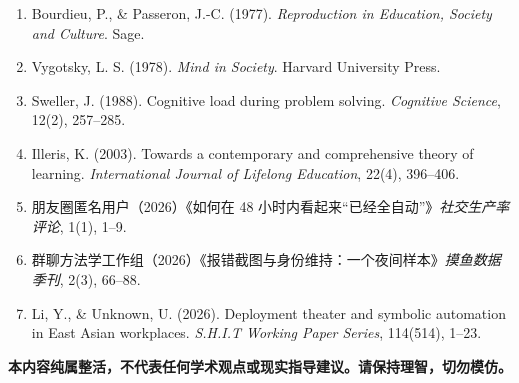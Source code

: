 \documentclass[11pt,a4paper]{ctexart}
\begin{document}
\begin{enumerate}[leftmargin=1.2em]
\item Bourdieu, P., \& Passeron, J.-C. (1977). \textit{Reproduction in Education, Society and Culture}. Sage.
\item Vygotsky, L. S. (1978). \textit{Mind in Society}. Harvard University Press.
\item Sweller, J. (1988). Cognitive load during problem solving. \textit{Cognitive Science}, 12(2), 257--285.
\item Illeris, K. (2003). Towards a contemporary and comprehensive theory of learning. \textit{International Journal of Lifelong Education}, 22(4), 396--406.
\item 朋友圈匿名用户（2026）《如何在 48 小时内看起来“已经全自动”》\textit{社交生产率评论}, 1(1), 1--9.
\item 群聊方法学工作组（2026）《报错截图与身份维持：一个夜间样本》\textit{摸鱼数据季刊}, 2(3), 66--88.
\item Li, Y., \& Unknown, U. (2026). Deployment theater and symbolic automation in East Asian workplaces. \textit{S.H.I.T Working Paper Series}, 114(514), 1--23.
\end{enumerate}

\vspace{0.8em}
\begin{center}
\colorbox{red!70}{\parbox{0.95\linewidth}{\centering\color{white}\bfseries 本内容纯属整活，不代表任何学术观点或现实指导建议。请保持理智，切勿模仿。}}
\end{center}
\end{document}

